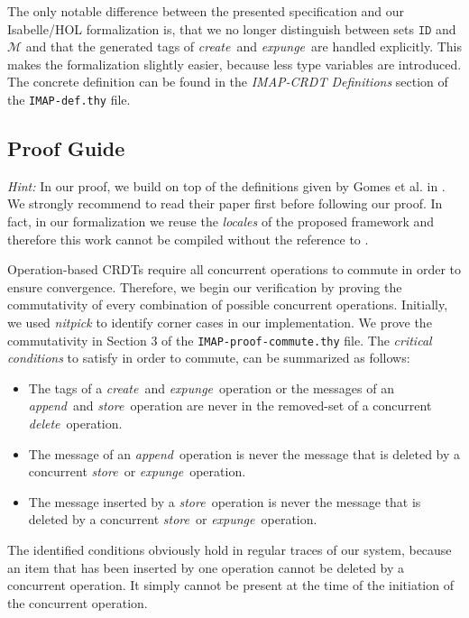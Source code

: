 \documentclass[11pt,a4paper, DIV=11]{article}
\newcommand{\create}{\textit{create}}
\newcommand{\delete}{\textit{delete}}
\newcommand{\store}{\textit{store}}
\newcommand{\append}{\textit{append}}
\newcommand{\expunge}{\textit{expunge}}
\begin{document}
The only notable difference between the presented specification and our Isabelle/HOL
formalization is, that we no longer distinguish between sets $\texttt{ID}$ and
$\mathcal{M}$ and that the generated tags of \create\ and \expunge\ are handled
explicitly. This makes the formalization slightly easier, because less type variables
are introduced. The concrete definition can be found in the \textit{IMAP-CRDT Definitions}
section of the \texttt{IMAP-def.thy} file.


\subsection{Proof Guide}

\textit{Hint:} In our proof, we build on top of the definitions given by Gomes et al{.}
in \cite{gomes_crdtisabelle}. We strongly recommend to read their paper first before
following our proof. In fact, in our formalization we reuse the \textit{locales} of the
proposed framework and therefore this work cannot be compiled without the reference
to \cite{gomes_crdtafp}.

Operation-based CRDTs require all concurrent operations to commute in order to ensure
convergence. Therefore, we begin our verification by proving the commutativity of every
combination of possible concurrent operations. Initially, we used \textit{nitpick} to
identify corner cases in our implementation. We prove the commutativity in Section 3
of the \texttt{IMAP-proof-commute.thy} file. The \textit{critical conditions} to satisfy
in order to commute, can be summarized as follows:
\begin{itemize}
  \item The tags of a \create\ and \expunge\ operation or the messages of an
  \append\ and \store\ operation are never in the removed-set of a concurrent
  \delete\ operation.
  \item The message of an \append\ operation is never the message that is
  deleted by a concurrent \store\ or \expunge\ operation.
  \item The message inserted by a \store\ operation is never the message
  that is deleted by a concurrent \store\ or \expunge\ operation.
\end{itemize}

The identified conditions obviously hold in regular traces of our system, because
an item that has been inserted by one operation cannot be deleted by a concurrent
operation. It simply cannot be present at the time of the initiation of the
concurrent operation.
\end{document}

